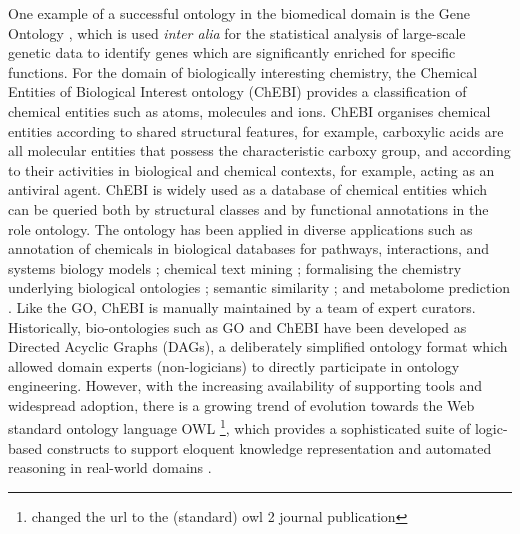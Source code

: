 \documentclass[10pt]{bmc_article}
\newenvironment{bmcformat}{\baselineskip20pt\sloppy\setboolean{publ}{false}}{\baselineskip20pt\sloppy}
\begin{document}
\begin{bmcformat}
One example of a successful ontology in the biomedical domain is the Gene Ontology \cite{go2000}, which is used \textit{inter alia} for the statistical analysis of large-scale genetic data to identify genes which are significantly enriched for specific functions.  For the domain of biologically interesting chemistry, the Chemical Entities of Biological Interest ontology (ChEBI) \cite{chebi2010} provides a classification of chemical entities such as atoms, molecules and ions.  ChEBI organises chemical entities according to shared structural features, for example, carboxylic acids are all molecular entities that possess the characteristic carboxy group, and according to their activities in biological and chemical contexts, for example, acting as an antiviral agent. ChEBI is widely used as a database of chemical entities which can be queried both by structural classes and by functional annotations in the role ontology. The ontology has been applied in diverse applications such as annotation of chemicals in biological databases for pathways, interactions, and systems biology models \cite{matthews2009,libiomodels2010,kerrien2007}; chemical text mining \cite{corbett2006}; formalising the chemistry underlying biological ontologies \cite{mungall2010}; semantic similarity \cite{couto2010}; and metabolome prediction \cite{swainston2010}. Like the GO, ChEBI is manually maintained by a team of expert curators.  Historically, bio-ontologies such as GO and ChEBI have been developed as Directed Acyclic Graphs (DAGs), a deliberately simplified ontology format which allowed domain experts (non-logicians) to directly participate in ontology engineering. However, with the increasing availability of supporting tools and widespread adoption, there is a growing trend of evolution  towards the Web standard ontology language OWL \cite{OWL2NextStep}\footnote{changed the url to the (standard) owl 2 journal publication}, which provides a sophisticated suite of logic-based constructs to support eloquent knowledge representation and automated reasoning in real-world domains \cite{alterovitz2010}.


\end{bmcformat}
\end{document}
